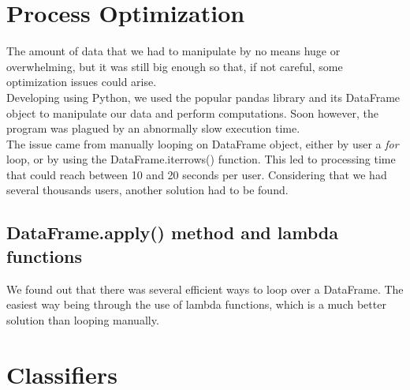 \documentclass[a4paper,11pt]{article}
\begin{document}
\section{Process Optimization}
The amount of data that we had to manipulate by no means huge or overwhelming, but it was still big enough so that, if not careful, some optimization issues could arise.\\

Developing using Python, we used the popular pandas library and its DataFrame object to manipulate our data and perform computations. Soon however, the program was plagued by an abnormally slow execution time.\\

The issue came from manually looping on DataFrame object, either by user a \textit{for} loop, or by using the DataFrame.iterrows() function. This led to processing time that could reach between 10 and 20 seconds per user. Considering that we had several thousands users, another solution had to be found.

\subsection{DataFrame.apply() method and lambda functions}
We found out that there was several efficient ways to loop over a DataFrame. The easiest way being through the use of lambda functions, which is a much better solution than looping manually.\\





\section{Classifiers}



\end{document}
